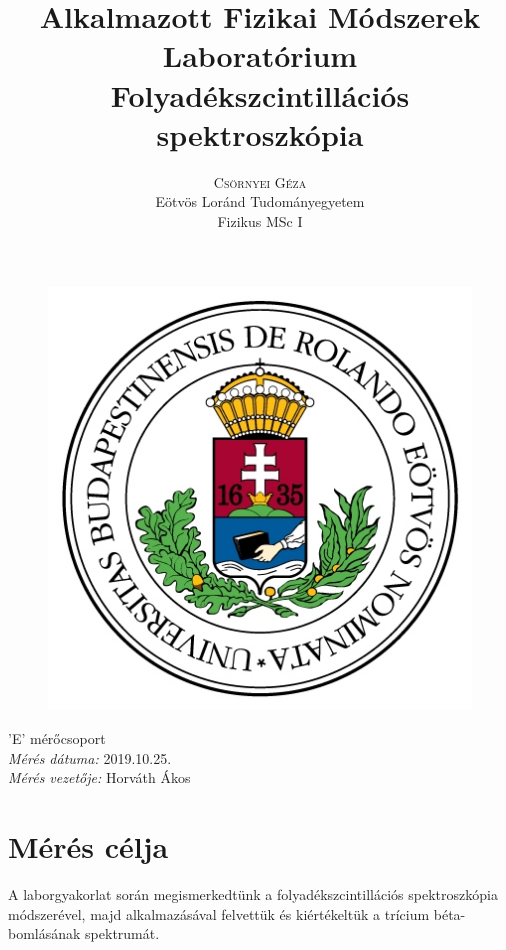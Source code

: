 \documentclass[12pt,a4paper]{article}
\title{\huge{Alkalmazott Fizikai Módszerek Laboratórium}\\ \vspace{20pt}
\textbf{Folyadékszcintillációs spektroszkópia}}
\author{\Large{\textsc{Csörnyei Géza}} \vspace{10pt}\\
	\textrm{Eötvös Loránd Tudományegyetem}\\
	\textrm{Fizikus MSc I}
	}
\date{}
\begin{document}
\addtolength{\voffset}{-1.0cm}
\addtolength{\textheight}{1.0cm}
\begin{titlepage}
\maketitle

\begin{figure}[!htb]
\centering
\includegraphics[scale=0.6]{eltecimer.jpg}
\end{figure}

\hfil \Large{'E' mérőcsoport}\hfil  \\
\vspace*{2pt}
\hfil \Large{\emph{Mérés dátuma:} 2019.10.25.}\hfil \\
\vspace*{2pt}
\hfil \hspace*{45pt} \Large{\emph{Mérés vezetője:} Horváth Ákos}\hfil
\thispagestyle{empty}
\end{titlepage}

\section{Mérés célja}
\hspace*{10pt} A laborgyakorlat során megismerkedtünk a folyadékszcintillációs spektroszkópia módszerével, majd alkalmazásával felvettük és kiértékeltük a trícium béta-bomlásának spektrumát.
\end{document}
